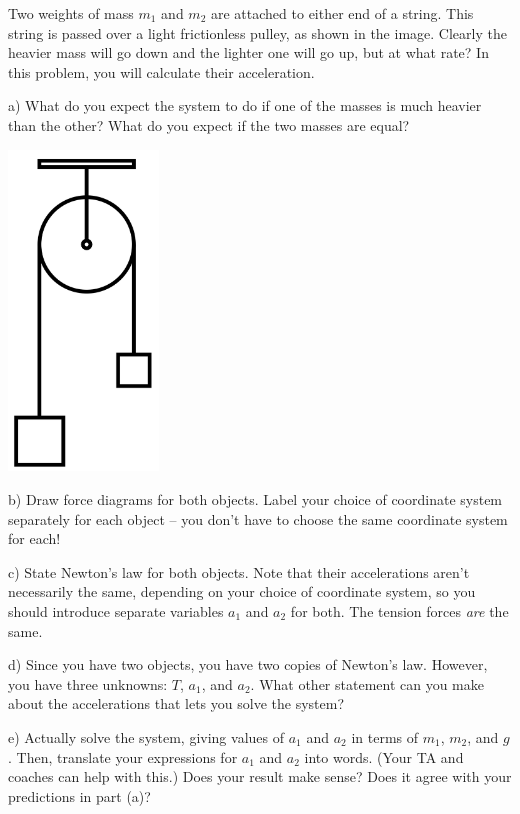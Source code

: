 \documentclass[12pt]{article}
\begin{document}
\newpage
\begin{minipage}{0.7\textwidth}
Two weights of mass $m_1$ and $m_2$ are attached to either end of a string. This string is passed over a light frictionless pulley, as shown in the image.
Clearly the heavier mass will go down and the lighter one will go up, but at what rate? In this problem, you will calculate their acceleration.

\bigskip\bigskip

a) What do you expect the system to do if one of the masses is much heavier than the other? What do you expect if the
two masses are equal?


\end{minipage} \hfill
\begin{minipage}{0.3\textwidth}
\begin{center}\includegraphics[width=0.3\textwidth]{atwood.png}
\end{center}
\end{minipage} \hfill




b) Draw force diagrams for both objects. Label your choice of coordinate system separately for each object -- you don't have to choose the same coordinate system for each! 

\vspace{2in}

c) State Newton's law for both objects. Note that their accelerations aren't necessarily the same, depending on your choice of coordinate system, so you should introduce separate variables $a_1$ and $a_2$ for both. The tension forces
{\it are} the same.

\newpage

d) Since you have two objects, you have two copies of Newton's law. However, you have three unknowns: $T$, $a_1$, and $a_2$. What other statement can you make about the accelerations that lets you solve the system?

\vspace{3in}

e) Actually solve the system, giving values of $a_1$ and $a_2$ in terms of $m_1$, $m_2$, and $g$. Then, translate 
your expressions for $a_1$ and $a_2$ into words. (Your TA and coaches can help with this.) Does your result make sense?
Does it agree with your predictions in part (a)? 
\end{document}
